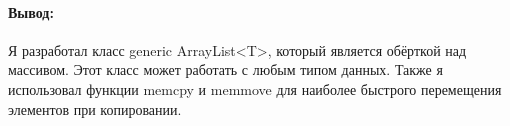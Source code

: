 \paragraph{Вывод:}
Я разработал класс generic ArrayList<T>, который является обёрткой над массивом.
Этот класс может работать с любым типом данных.
Также я использовал функции memcpy и memmove для наиболее быстрого перемещения элементов при копировании.
